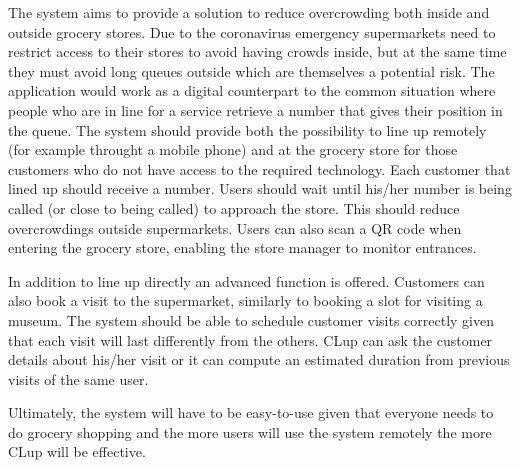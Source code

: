 The system aims to provide a solution to reduce overcrowding both inside and outside grocery stores.
Due to the coronavirus emergency supermarkets need to restrict access to their stores to avoid having crowds inside, but at the same time they must avoid long queues outside which are themselves a potential risk.
The application would work as a digital counterpart to the common situation where people who are in line for a service retrieve a number that gives their position in the queue.
The system should provide both the possibility to line up remotely (for example throught a mobile phone) and at the grocery store for those customers who do not have access to the required technology.
Each customer that lined up should receive a number. Users should wait until his/her number is being called (or close to being called) to approach the store. This should reduce overcrowdings outside supermarkets.
Users can also scan a QR code when entering the grocery store, enabling the store manager to monitor entrances. 

In addition to line up directly an advanced function is offered. Customers can also book a visit to the supermarket, similarly to booking a slot for visiting a museum. The system should be able to schedule customer visits correctly given that each visit will last differently from the others.  
CLup can ask the customer details about his/her visit or it can compute an estimated duration from previous visits of the same user.

Ultimately, the system will have to be easy-to-use given that everyone needs to do grocery shopping and the more users will use the system remotely the more CLup will be effective.

